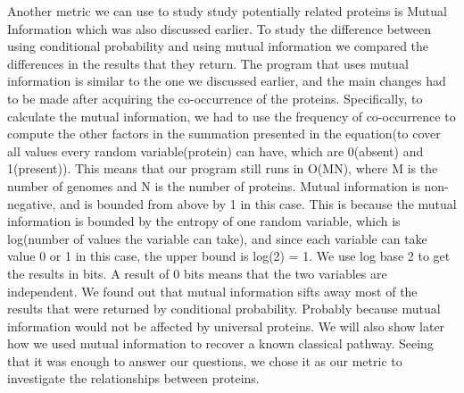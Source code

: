 \documentclass{ucetd}
\begin{document}
Another metric we can use to study study potentially related proteins is Mutual Information which was also discussed earlier. To study the difference between using conditional probability and using mutual information we compared the differences in the results that they return. The program that uses mutual information is similar to the one we discussed earlier, and the main changes had to be made after acquiring the co-occurrence of the proteins. Specifically, to calculate the mutual information, we had to use the frequency of co-occurrence to compute the other factors in the summation presented in the equation(to cover all values every random variable(protein) can have, which are 0(absent) and 1(present)). This means that our program still runs in O(MN), where M is the number of genomes and N is the number of proteins. Mutual information is non-negative, and is bounded from above by 1 in this case. This is because the mutual information is bounded by the entropy of one random variable, which is log(number of values the variable can take), and since each variable can take value 0 or 1 in this case, the upper bound is log(2)  = 1. We use log base 2 to get the results in bits. A result of 0 bits means that the two variables are independent. We found out that mutual information sifts away most of the results that were returned by conditional probability. Probably because mutual information would not be affected by universal proteins. We will also show later how we used mutual information to recover a known classical pathway. Seeing that it was enough to answer our questions, we chose it as our metric to investigate the relationships between proteins.
\end{document}
